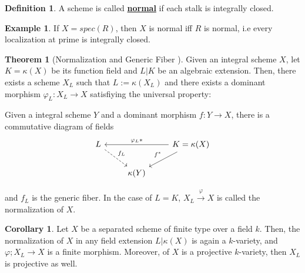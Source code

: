 \documentclass{article}
\theoremstyle{definition}
\newtheorem{theorem}{Theorem}[section]
\theoremstyle{definition}
\newtheorem{definition}{Definition}[theorem]
\theoremstyle{definition}
\theoremstyle{definition}
\theoremstyle{definition}
\theoremstyle{definition}
\newtheorem{corollary}{Corollary}[theorem]
\theoremstyle{definition}
\newtheorem{example}{Example}[theorem]
\begin{document}
\begin{tcolorbox}[colback=purple!5!white,colframe=purple!75!black]
\begin{definition}
A scheme is called \underline{\textbf{normal}} if each stalk is integrally closed. 
\end{definition}
\end{tcolorbox}


\begin{tcolorbox}[colback=yellow!5!white,colframe=yellow!30!white]
\begin{example}
If $X=spec(R)$, then $X$ is normal iff $R$ is normal, i.e every localization at prime is integrally closed. 
\end{example}
\end{tcolorbox}






\begin{tcolorbox}[colback=red!5!white,colframe=red!30!white]
\begin{theorem}[Normalization and Generic Fiber ]
Given an integral scheme $X$, let $K=\kappa (X)$ be its function field and $L|K$ be an algebraic extension. Then, there exists a scheme $X_L$ such that $L:=\kappa(X_L)$ and there exists a dominant morphism 
$\varphi_L: X_L\to X$ satisfiying the universal property:

Given a integral scheme $Y$ and a dominant morphism $f: Y\to X$, there is a commutative diagram of fields
\[\begin{tikzcd}
	L && {K=\kappa(X)} \\
	& {\kappa(Y)}
	\arrow["{f_L}", dashed, from=1-1, to=2-2]
	\arrow["{\varphi_L*}"', from=1-3, to=1-1]
	\arrow["{f^{*}}"', from=1-3, to=2-2]
\end{tikzcd}\]
\end{theorem}
\end{tcolorbox}
and $f_L$ is the generic fiber. In the case of $L=K$, $X_L\xrightarrow{\varphi}X$ is called the normalization of $X$. 


\begin{tcolorbox}[colback=green!5!white,colframe=green!30!white]
\begin{corollary}
Let $X$ be a separated scheme of finite type over a field $k$. Then, the normalization of $X$ in any field extension $L|\kappa(X)$ is again a $k$-variety, and $\varphi; X_L\to X$  is a finite morphism. Moreover, of $X$ is a projective $k$-variety, then $X_L$ is projective as well. 
\end{corollary}
\end{tcolorbox}
\end{document}

